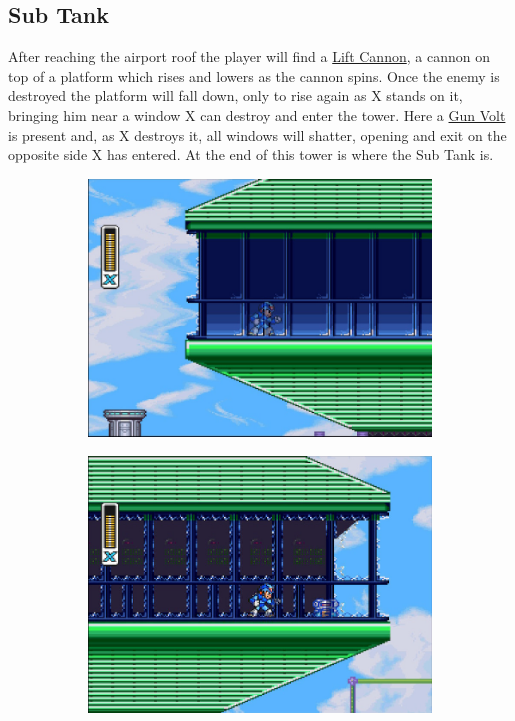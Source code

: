 \subsection{Sub Tank}
After reaching the airport roof the player will find a 	\hyperlink{enem:Lift_cannon}{Lift Cannon}, a cannon on top of a platform which rises and lowers as the cannon spins. Once the enemy is destroyed the platform will fall down, only to rise again as X stands on it, bringing him near a window X can destroy and enter the tower. Here a \hyperlink{enem:Gun_Volt}{Gun Volt} is present and, as X destroys it, all windows will shatter, opening and exit on the opposite side X has entered. At the end of this tower is where the Sub Tank is. 
 
 \begin{figure}[htp]
 	\centering
 	\begin{subfigure}{0.4\linewidth}
 		\centering
 		\includegraphics[width=\linewidth]{figures/X1/Storm_eagle/Storm_tank_1.jpg}
 		\caption{}
 	\end{subfigure}
 	\begin{subfigure}{0.4\linewidth}
 		\centering
 		\includegraphics[width=\linewidth]{figures/X1/Storm_eagle/Storm_tank_2.jpg}

\end{subfigure}
\end{figure}

